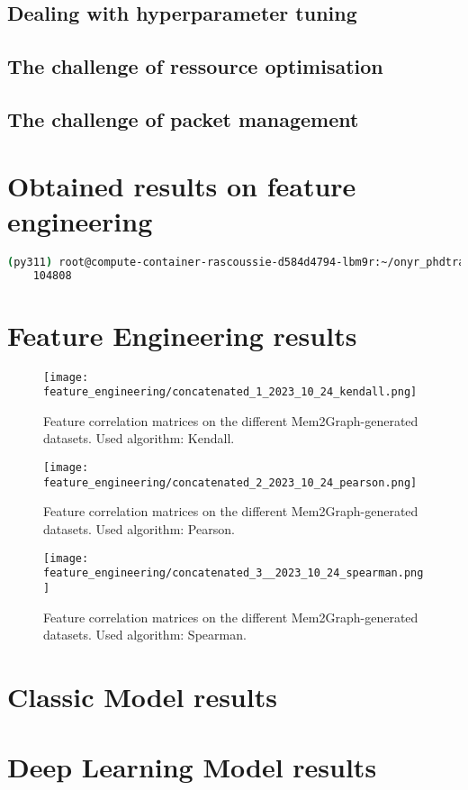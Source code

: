 \subsection{Dealing with hyperparameter tuning}

\subsection{The challenge of ressource optimisation}

\subsection{The challenge of packet management}

\section{Obtained results on feature engineering}

\begin{lstlisting}[language=bash, caption={Command used to count the number of .gv memory graph files generated by \textit{mem2graph} inside one of the servers mem2graph dataset directory.}]
    (py311) root@compute-container-rascoussie-d584d4794-lbm9r:~/onyr_phdtrack/mem2graph# find data/ -type f -name "*.gv" | wc -l
    104808
\end{lstlisting}

\section{Feature Engineering results}

\begin{figure}[H]\label{results:corr_matrices:kendall}
    \centering
    \texttt{[image: feature\_engineering/concatenated\_1\_2023\_10\_24\_kendall.png]}
    \caption{Feature correlation matrices on the different Mem2Graph-generated datasets. Used algorithm: Kendall.}
\end{figure}

\begin{figure}[H]\label{results:corr_matrices:pearson}
    \centering
    \texttt{[image: feature\_engineering/concatenated\_2\_2023\_10\_24\_pearson.png]}
    \caption{Feature correlation matrices on the different Mem2Graph-generated datasets. Used algorithm: Pearson.}
\end{figure}

\begin{figure}[H]\label{results:corr_matrices:spearman}
    \centering
    \texttt{[image: feature\_engineering/concatenated\_3\_\_2023\_10\_24\_spearman.png]}
    \caption{Feature correlation matrices on the different Mem2Graph-generated datasets. Used algorithm: Spearman.}
\end{figure}

\section{Classic Model results}

\section{Deep Learning Model results}


